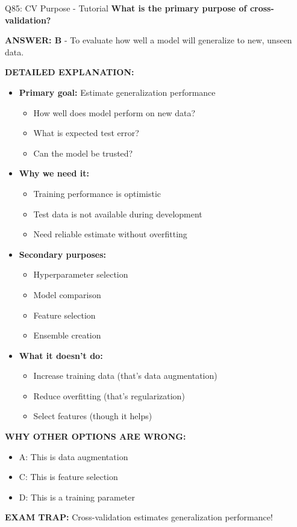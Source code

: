 \documentclass[8pt]{beamer}
\begin{document}
	\begin{frame}{Q85: CV Purpose - Tutorial}
		\fontsize{6.5}{7.5}\selectfont
		\textbf{What is the primary purpose of cross-validation?}
		
		\vspace{0.05cm}
		\textcolor{myblue}{\textbf{ANSWER: B}} - To evaluate how well a model will generalize to new, unseen data.
		
		\vspace{0.05cm}
		\textbf{DETAILED EXPLANATION:}
		\begin{itemize}
			\item \textbf{Primary goal:} Estimate generalization performance
			\begin{itemize}
				\item How well does model perform on new data?
				\item What is expected test error?
				\item Can the model be trusted?
			\end{itemize}
			\item \textbf{Why we need it:}
			\begin{itemize}
				\item Training performance is optimistic
				\item Test data is not available during development
				\item Need reliable estimate without overfitting
			\end{itemize}
			\item \textbf{Secondary purposes:}
			\begin{itemize}
				\item Hyperparameter selection
				\item Model comparison
				\item Feature selection
				\item Ensemble creation
			\end{itemize}
			\item \textbf{What it doesn't do:}
			\begin{itemize}
				\item Increase training data (that's data augmentation)
				\item Reduce overfitting (that's regularization)
				\item Select features (though it helps)
			\end{itemize}
		\end{itemize}
		
		\vspace{0.05cm}
		\textcolor{myred}{\textbf{WHY OTHER OPTIONS ARE WRONG:}}
		\begin{itemize}
			\item \textcolor{myred}{A:} This is data augmentation
			\item \textcolor{myred}{C:} This is feature selection
			\item \textcolor{myred}{D:} This is a training parameter
		\end{itemize}
		
		\textcolor{myred}{\textbf{EXAM TRAP:}} Cross-validation estimates generalization performance!
	\end{frame}
	
\end{document}
